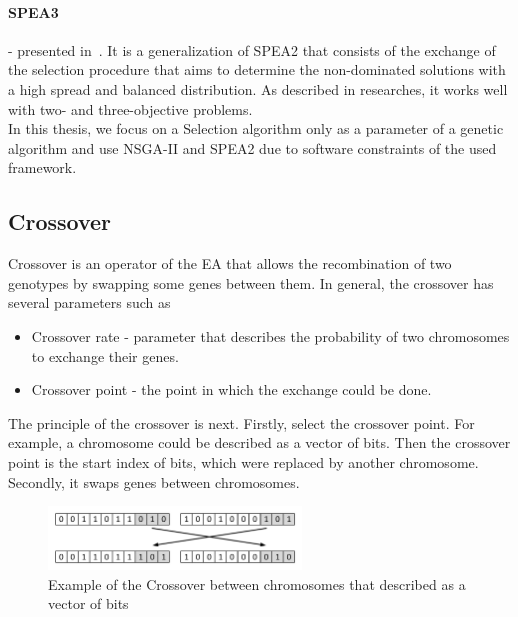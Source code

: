 \paragraph{SPEA3} - presented in~\cite{rudzinski15}. It is a generalization of SPEA2 that consists of the exchange of the selection procedure that aims to determine the non-dominated solutions with a high spread and balanced distribution. As described in researches, it works well with two- and three-objective problems. \\

In this thesis, we focus on a Selection algorithm only as a parameter of a genetic algorithm and use NSGA-II and SPEA2 due to software constraints of the used framework. 

\subsection{Crossover}\label{sec:GeneticAlgorithmCrossover}

Crossover is an operator of the EA that allows the recombination of two genotypes by swapping some genes between them.
In general, the crossover has several parameters such as

\begin{itemize}
	\item Crossover rate - parameter that describes the probability of two chromosomes to exchange their genes.
	\item Crossover point - the point in which the exchange could be done.
\end{itemize}

The principle of the crossover is next.
Firstly, select the crossover point. For example, a chromosome could be described as a vector of bits. Then the crossover point is the start index of bits, which were replaced by another chromosome.
Secondly, it swaps genes between chromosomes.

\begin{figure}
	\centering
	\includegraphics[width=0.6\textwidth]{images/crossoverVector.pdf}
	\caption[Example of the Crossover]{Example of the Crossover between chromosomes that described as a vector of bits}
	\label{fig:crossoverVector}
\end{figure}

